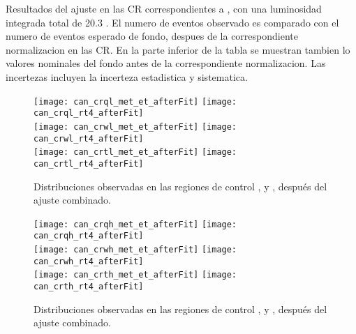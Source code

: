 \begin{table}[!htbp]

  \caption{Resultados del ajuste en las CR correspondientes a {\SRH}, con una luminosidad integrada total de 20.3 \ifb.
    El numero de eventos observado es comparado con el numero de eventos esperado de fondo, despues de la correspondiente
    normalizacion en las CR. En la parte inferior de la tabla se muestran tambien lo valores nominales del fondo antes de
    la correspondiente normalizacion. Las incertezas incluyen la incerteza estadistica y sistematica.}
  \label{tab:fit_result_cr3}

  

\end{table}


\begin{figure}[!htbp]
  \centering

  \texttt{[image: can\_crql\_met\_et\_afterFit]}
  \texttt{[image: can\_crql\_rt4\_afterFit]} \\

  \texttt{[image: can\_crwl\_met\_et\_afterFit]}
  \texttt{[image: can\_crwl\_rt4\_afterFit]} \\

  \texttt{[image: can\_crtl\_met\_et\_afterFit]}
  \texttt{[image: can\_crtl\_rt4\_afterFit]} \\

  \caption{Distribuciones observadas en las regiones de control {\CRQL}, {\CRWL}
    y {\CRTL}, después del ajuste combinado.}
  \label{fig:bkgfit_crl_after}

\end{figure}


\begin{figure}[!htbp]
  \centering

  \texttt{[image: can\_crqh\_met\_et\_afterFit]}
  \texttt{[image: can\_crqh\_rt4\_afterFit]} \\

  \texttt{[image: can\_crwh\_met\_et\_afterFit]}
  \texttt{[image: can\_crwh\_rt4\_afterFit]} \\

  \texttt{[image: can\_crth\_met\_et\_afterFit]}
  \texttt{[image: can\_crth\_rt4\_afterFit]} \\

  \caption{Distribuciones observadas en las regiones de control {\CRQH}, {\CRWH}
    y {\CRTH},  después del ajuste combinado.}
  \label{fig:bkgfit_CRh_after}

\end{figure}





